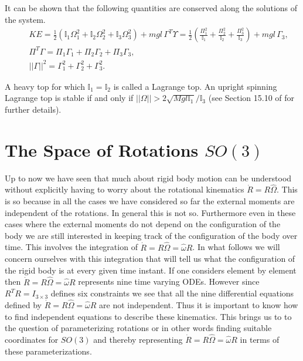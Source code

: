 \documentclass[graybox,envcountchap,sectrefs]{svmonoMuga}
\begin{document}
It can be shown that the following quantities are conserved along the solutions of the system.
\begin{eqnarray}
&& KE=\frac{1}{2}(\mathbb{I}_1\Omega_1^2+\mathbb{I}_2\Omega_2^2+\mathbb{I}_3\Omega_3^2)+mgl\,\Gamma^T \Upsilon =\frac{1}{2}\left(\frac{\Pi_1^2}{\mathbb{I}_1}+\frac{\Pi_2^2}{\mathbb{I}_2}+\frac{\Pi_3^2}{\mathbb{I}_3}\right)+mgl\,
\Gamma_3,\label{eq:KEConst}\\
&& \Pi^T\Gamma = \Pi_1\Gamma_1+\Pi_2\Gamma_2+\Pi_3\Gamma_3,\\
&& ||\Gamma||^2=\Gamma^2_1+\Gamma^2_2+\Gamma^2_3.
\end{eqnarray}

A heavy top for which $\mathbb{I}_1=\mathbb{I}_2$ is called a Lagrange top. An upright spinning Lagrange top is stable  if and only if $||\Omega||>2\sqrt{Mgl\mathbb{I}_1}/\mathbb{I}_3$ (see Section 15.10 of \cite{Marsden} for further details).






\section{The Space of Rotations $SO(3)$}\label{Secn:SO3}
Up to now we have seen that much about rigid body motion can be understood without explicitly having to worry about the rotational kinematics $\dot{R}=R\widehat{\Omega}$. This is so because in all the cases we have considered so far the external moments are independent of the rotations. In general this is not so. Furthermore even in these cases where the external moments do not depend on the configuration of the body we are still interested in keeping track of the configuration of the body over time. This involves the integration of $\dot{R}=R\widehat{\Omega}=\widehat{\omega} R$. 
In what follows we will concern ourselves with this integration that will tell us what the configuration of the rigid body is at every given time instant. If one considers element by element then $\dot{R}=R\widehat{\Omega}=\widehat{\omega} R$ represents nine time varying ODEs. However since $R^TR=I_{3\times 3}$ defines six constraints we see that all the nine differential equations defined by $\dot{R}=R\widehat{\Omega}=\widehat{\omega} R$ are not independent. Thus it is important to know how to find independent equations to describe these kinematics.
This brings us to to the question of parameterizing rotations or in other words finding suitable coordinates for $SO(3)$ and thereby representing $\dot{R}=R\widehat{\Omega}=\widehat{\omega} R$ in terms of these parameterizations.
\end{document}
